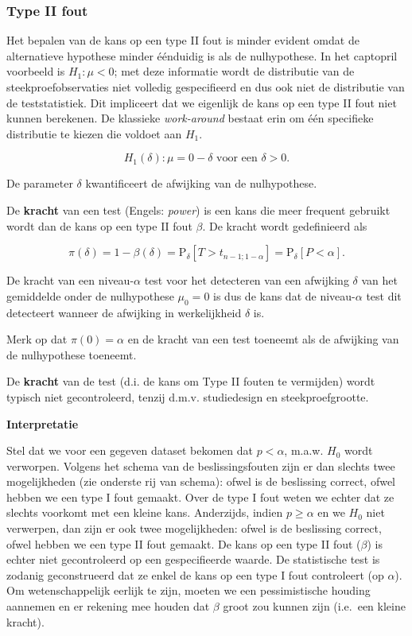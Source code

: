 \documentclass[
  12pt,dutch,coursenotes]{book}
\theoremstyle{definition}
\theoremstyle{definition}
\theoremstyle{definition}
\theoremstyle{definition}
\theoremstyle{remark}
\begin{document}
\hypertarget{type-ii-fout}{%
\subsubsection{Type II fout}\label{type-ii-fout}}

Het bepalen van de kans op een type II fout is minder evident omdat de alternatieve hypothese minder éénduidig is als de nulhypothese. In het captopril voorbeeld is \(H_1: \mu<0\); met deze informatie wordt de distributie van de steekproefobservaties niet volledig gespecifieerd en dus ook niet de distributie van de teststatistiek. Dit impliceert dat we eigenlijk de kans op een type II fout niet kunnen berekenen. De klassieke \emph{work-around} bestaat erin om één specifieke distributie te kiezen die voldoet aan \(H_1\).

\[H_1(\delta): \mu=0-\delta \text{ voor een }\delta>0.\]

De parameter \(\delta\) kwantificeert de afwijking van de nulhypothese.

De \textbf{kracht} van een test (Engels: \emph{power}) is een kans die meer frequent gebruikt wordt dan de kans op een type II fout \(\beta\). De kracht wordt gedefinieerd als

\[\pi(\delta) = 1-\beta(\delta) = \text{P}_\delta\left[T>t_{n-1;1-\alpha}\right]=\text{P}_\delta\left[P<\alpha\right].\]

De kracht van een niveau-\(\alpha\) test voor het detecteren van een afwijking \(\delta\) van het gemiddelde onder de nulhypothese \(\mu_0=0\) is dus de kans dat de niveau-\(\alpha\) test dit detecteert wanneer de afwijking in werkelijkheid \(\delta\) is.

Merk op dat \(\pi(0)=\alpha\) en de kracht van een test toeneemt als de afwijking van de nulhypothese toeneemt.

De \textbf{kracht} van de test (d.i. de kans om Type II fouten te vermijden) wordt typisch niet gecontroleerd, tenzij d.m.v. studiedesign en steekproefgrootte.

\textbf{Interpretatie}

Stel dat we voor een gegeven dataset bekomen dat \(p<\alpha\), m.a.w. \(H_0\) wordt verworpen. Volgens het schema van de beslissingsfouten zijn er dan slechts twee mogelijkheden (zie onderste rij van schema): ofwel is de beslissing correct, ofwel hebben we een type I fout gemaakt. Over de type I fout weten we echter dat ze slechts voorkomt met een kleine kans.
Anderzijds, indien \(p\geq \alpha\) en we \(H_0\) niet verwerpen, dan zijn er ook twee mogelijkheden: ofwel is de beslissing correct, ofwel hebben we een type II fout gemaakt. De kans op een type II fout (\(\beta\)) is echter niet gecontroleerd op een gespecifieerde waarde. De statistische test is zodanig geconstrueerd dat ze enkel de kans op een type I fout controleert (op \(\alpha\)). Om wetenschappelijk eerlijk te zijn, moeten we een pessimistische houding aannemen en er rekening mee houden dat \(\beta\) groot zou kunnen zijn (i.e.~een kleine kracht).
\end{document}
